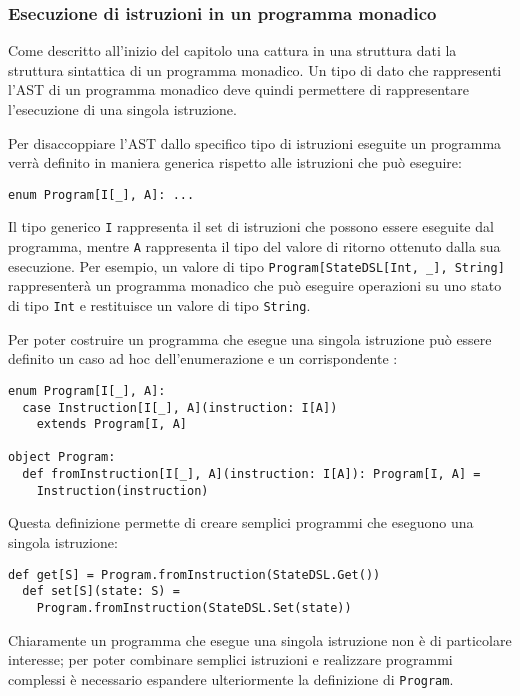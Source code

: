\subsubsection{Esecuzione di istruzioni in un programma monadico}
Come descritto all'inizio del capitolo una  cattura in una struttura dati la struttura sintattica di un programma monadico.
Un tipo di dato che rappresenti l'\ac{AST} di un programma monadico deve quindi permettere di rappresentare l'esecuzione di una singola istruzione.

Per disaccoppiare l'\ac{AST} dallo specifico tipo di istruzioni eseguite un programma verrà definito in maniera generica rispetto alle istruzioni che può eseguire:
\begin{lstlisting}[language=scala3]
enum Program[I[_], A]: ...
\end{lstlisting}
Il tipo generico \lstinline{I} rappresenta il set di istruzioni che possono essere eseguite dal programma, mentre \lstinline{A} rappresenta il tipo del valore di ritorno ottenuto dalla sua esecuzione. Per esempio, un valore di tipo \lstinline{Program[StateDSL[Int, _], String]} rappresenterà un programma monadico che può eseguire operazioni su uno stato di tipo \lstinline{Int} e restituisce un valore di tipo \lstinline{String}.

Per poter costruire un programma che esegue una singola istruzione può essere definito un caso ad hoc dell'enumerazione e un corrispondente :
\begin{lstlisting}[language=scala3]
enum Program[I[_], A]:
  case Instruction[I[_], A](instruction: I[A])
    extends Program[I, A]

object Program:
  def fromInstruction[I[_], A](instruction: I[A]): Program[I, A] =
    Instruction(instruction)
\end{lstlisting}

Questa definizione permette di creare semplici programmi che eseguono una singola istruzione:
\begin{lstlisting}[language=scala3]
  def get[S] = Program.fromInstruction(StateDSL.Get())
  def set[S](state: S) =
    Program.fromInstruction(StateDSL.Set(state))
\end{lstlisting}

Chiaramente un programma che esegue una singola istruzione non è di particolare interesse; per poter combinare semplici istruzioni e realizzare programmi complessi è necessario espandere ulteriormente la definizione di \lstinline{Program}.

